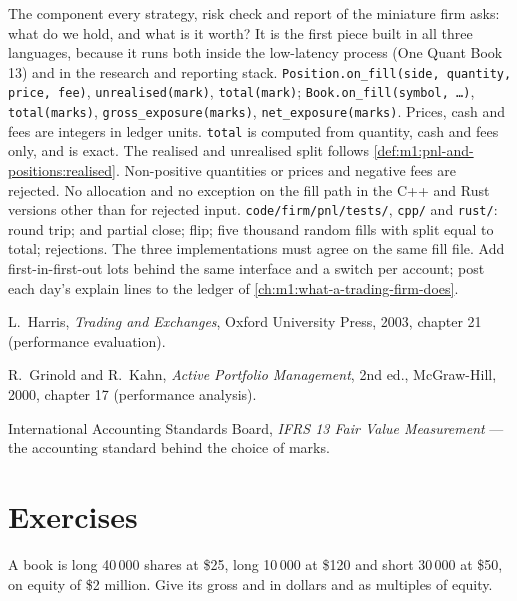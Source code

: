 \begin{build}
 The component every strategy, risk check and report of the
miniature firm asks: what do we hold, and what is it worth? It is the first
piece built in all three languages, because it runs both inside the
low-latency process (One Quant Book 13) and in the research and reporting
stack.
 \texttt{Position.on\_fill(side, quantity, price, fee)},
\texttt{unrealised(mark)}, \texttt{total(mark)}; \texttt{Book.on\_fill(symbol,
\dots)}, \texttt{total(marks)}, \texttt{gross\_exposure(marks)},
\texttt{net\_exposure(marks)}. Prices, cash and fees are integers in ledger
units.
 \texttt{total} is computed from quantity, cash and fees only,
and is exact. The realised and unrealised split follows
\cref{def:m1:pnl-and-positions:realised}. Non-positive quantities or prices
and negative fees are rejected. No allocation and no exception on the fill
path in the C++ and Rust versions other than for rejected input.
 \texttt{code/firm/pnl/tests/}, \texttt{cpp/} and
\texttt{rust/}: round trip;  and partial close; flip; five
thousand random fills with split equal to total; rejections. The three
implementations must agree on the same fill file.
 Add first-in-first-out lots behind the same interface and a
switch per account; post each day's explain lines to the ledger of
\cref{ch:m1:what-a-trading-firm-does}.
\end{build}

\begin{omsources}
\item L.~Harris, \emph{Trading and Exchanges}, Oxford University Press, 2003,
chapter 21 (performance evaluation).
\item R.~Grinold and R.~Kahn, \emph{Active Portfolio Management}, 2nd ed.,
McGraw-Hill, 2000, chapter 17 (performance analysis).
\item International Accounting Standards Board, \emph{IFRS 13 Fair Value
Measurement} --- the accounting standard behind the choice of marks.
\end{omsources}

\section{Exercises}

\begin{exercise}[$\star$]\label{exo:m1:pnl-and-positions:1}
A book is long 40\,000 shares at \$25, long 10\,000 at \$120 and short
30\,000 at \$50, on equity of \$2 million. Give its gross and  in
dollars and as multiples of equity.
\end{exercise}

